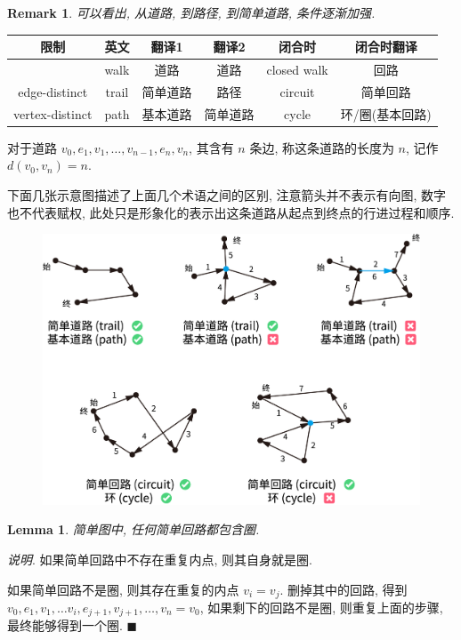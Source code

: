 \documentclass[UTF8]{ctexart}
\theoremstyle{mystyle}
\newtheorem{lemma}{Lemma}[section]
\theoremstyle{myremark}
\newtheorem*{remark}{Remark}
\theoremstyle{plain}
\newenvironment{explanation}{\textit{说明}.}{\hfill$\blacksquare$}
\begin{document}
\begin{remark}
    可以看出, 从道路, 到路径, 到简单道路, 条件逐渐加强. 
\end{remark}

\begin{table}[H]
    \centering
    \begin{tabular}{c|ccc|cc}
        限制 & 英文 & 翻译1 & 翻译2 & 闭合时 & 闭合时翻译 \\ \hline
            & walk & 道路 & 道路 & closed walk & 回路 \\ \hline
        edge-distinct & trail & 简单道路 & 路径 & circuit & 简单回路 \\ \hline
        vertex-distinct & path & 基本道路 & 简单道路 & cycle & 环/圈(基本回路)
    \end{tabular}
\end{table}

对于道路 $ v_0, e_1, v_1, \dots, v_{n - 1}, e_n, v_n $, 其含有 $ n $ 条边, 称这条道路的长度为 $ n $, 记作 $ d(v_0, v_n) = n $.

下面几张示意图描述了上面几个术语之间的区别, 注意箭头并不表示有向图, 数字也不代表赋权, 此处只是形象化的表示出这条道路从起点到终点的行进过程和顺序.
\begin{figure}[H]
    \centering
    \includegraphics[width = 0.9\linewidth]{./images/walks.png}
\end{figure}


\begin{lemma}
    简单图中, 任何简单回路都包含圈.
\end{lemma}

\begin{explanation}
    如果简单回路中不存在重复内点, 则其自身就是圈.

    如果简单回路不是圈, 则其存在重复的内点 $ v_i = v_j $. 删掉其中的回路, 得到 $ v_0, e_1, v_1, \dots v_i, e_{j + 1}, v_{j + 1}, \dots, v_{n} = v_0 $, 如果剩下的回路不是圈, 则重复上面的步骤, 最终能够得到一个圈. 
\end{explanation}
\end{document}
